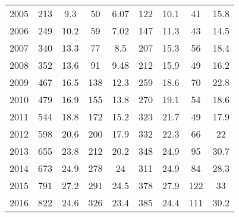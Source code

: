 \begin{table}[htbp]
\begin{tabular}{l*{8}{c}}
2005      &      213&      9.3&       50&     6.07&      122&     10.1&       41&     15.8\\
2006      &      249&     10.2&       59&     7.02&      147&     11.3&       43&     14.5\\
2007      &      340&     13.3&       77&      8.5&      207&     15.3&       56&     18.4\\
2008      &      352&     13.6&       91&     9.48&      212&     15.9&       49&     16.2\\
2009      &      467&     16.5&      138&     12.3&      259&     18.6&       70&     22.8\\
2010      &      479&     16.9&      155&     13.8&      270&     19.1&       54&     18.6\\
2011      &      544&     18.8&      172&     15.2&      323&     21.7&       49&     17.9\\
2012      &      598&     20.6&      200&     17.9&      332&     22.3&       66&       22\\
2013      &      655&     23.8&      212&     20.2&      348&     24.9&       95&     30.7\\
2014      &      673&     24.9&      278&       24&      311&     24.9&       84&     28.3\\
2015      &      791&     27.2&      291&     24.5&      378&     27.9&      122&       33\\
2016      &      822&     24.6&      326&     23.4&      385&     24.4&      111&     30.2\\
\hline\hline
\end{tabular}
\end{table}
